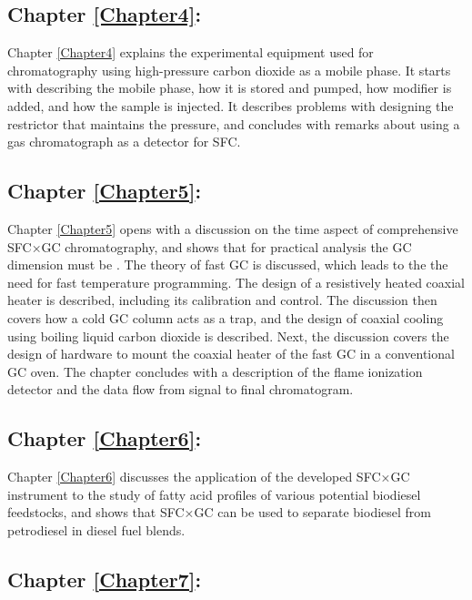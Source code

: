 \subsection{Chapter \ref{Chapter4}:  }
 
Chapter \ref{Chapter4} explains the experimental equipment used for
chromatography using high-pressure carbon dioxide as a mobile phase. It starts
with describing the mobile phase, how it is stored and pumped, how modifier is
added, and how the sample is injected. It describes problems with designing the
restrictor that maintains the pressure, and concludes with remarks about using a
gas chromatograph as a detector for SFC. 

\subsection{Chapter \ref{Chapter5}:  }

Chapter \ref{Chapter5} opens with a discussion on the time aspect of
comprehensive SFC×GC chromatography, and shows that for practical analysis the
GC dimension must be . The theory of fast GC is discussed, which
leads to the the need for fast temperature programming. The design of a
resistively heated coaxial heater is described, including its calibration and
control. The discussion then covers how a cold GC column acts as a trap, and the
design of coaxial cooling using boiling liquid carbon dioxide is described.
Next, the discussion covers the design of hardware to mount the coaxial heater
of the fast GC in a conventional GC oven. The chapter concludes with a
description of the flame ionization detector and the data flow from signal to
final chromatogram.

\subsection{Chapter \ref{Chapter6}:  }

Chapter \ref{Chapter6} discusses the application of the developed SFC×GC
instrument to the study of fatty acid profiles of various potential biodiesel
feedstocks, and shows that SFC×GC can be used to separate biodiesel from
petrodiesel in diesel fuel blends.

\subsection{Chapter \ref{Chapter7}:  }

